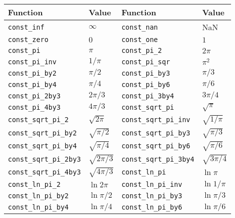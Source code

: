 \begin{table}
  \begin{tabularx}{\textwidth}{p{1.2in}Lp{1.2in}L}
    \toprule
    Function & Value & Function & Value \\
    \midrule
    \texttt{const\_inf}            & $\infty$        &
    \texttt{const\_nan}            & NaN             \\
    \texttt{const\_zero}           & $0$             &
    \texttt{const\_one}            & $1$             \\
    \texttt{const\_pi}             & $\pi$           &
    \texttt{const\_pi\_2}          & $2\pi$          \\
    \texttt{const\_pi\_inv}        & $1/\pi$         &
    \texttt{const\_pi\_sqr}        & $\pi^2$         \\
    \texttt{const\_pi\_by2}        & $\pi/2$         &
    \texttt{const\_pi\_by3}        & $\pi/3$         \\
    \texttt{const\_pi\_by4}        & $\pi/4$         &
    \texttt{const\_pi\_by6}        & $\pi/6$         \\
    \texttt{const\_pi\_2by3}       & $2\pi/3$        &
    \texttt{const\_pi\_3by4}       & $3\pi/4$        \\
    \texttt{const\_pi\_4by3}       & $4\pi/3$        &
    \texttt{const\_sqrt\_pi}       & $\sqrt{\pi}$    \\
    \texttt{const\_sqrt\_pi\_2}    & $\sqrt{2\pi}$   &
    \texttt{const\_sqrt\_pi\_inv}  & $\sqrt{1/\pi}$  \\
    \texttt{const\_sqrt\_pi\_by2}  & $\sqrt{\pi/2}$  &
    \texttt{const\_sqrt\_pi\_by3}  & $\sqrt{\pi/3}$  \\
    \texttt{const\_sqrt\_pi\_by4}  & $\sqrt{\pi/4}$  &
    \texttt{const\_sqrt\_pi\_by6}  & $\sqrt{\pi/6}$  \\
    \texttt{const\_sqrt\_pi\_2by3} & $\sqrt{2\pi/3}$ &
    \texttt{const\_sqrt\_pi\_3by4} & $\sqrt{3\pi/4}$ \\
    \texttt{const\_sqrt\_pi\_4by3} & $\sqrt{4\pi/3}$ &
    \texttt{const\_ln\_pi}         & $\ln{\pi}$      \\
    \texttt{const\_ln\_pi\_2}      & $\ln{2\pi}$     &
    \texttt{const\_ln\_pi\_inv}    & $\ln{1/\pi}$    \\
    \texttt{const\_ln\_pi\_by2}    & $\ln{\pi/2}$    &
    \texttt{const\_ln\_pi\_by3}    & $\ln{\pi/3}$    \\
    \texttt{const\_ln\_pi\_by4}    & $\ln{\pi/4}$    &
    \texttt{const\_ln\_pi\_by6}    & $\ln{\pi/6}$    \\

\end{tabularx}
\end{table}
